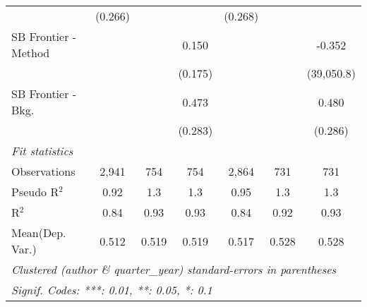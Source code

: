 \begin{tabular}{lcccccc}
                                & (0.266)     &             &             & (0.268)      &             &   \\   
   SB Frontier - Method         &             &             & 0.150       &              &             & -0.352\\   
                                &             &             & (0.175)     &              &             & (39,050.8)\\   
   SB Frontier - Bkg.           &             &             & 0.473       &              &             & 0.480\\   
                                &             &             & (0.283)     &              &             & (0.286)\\   
   \midrule
   \emph{Fit statistics}\\
   Observations                 & 2,941       & 754         & 754         & 2,864        & 731         & 731\\  
   Pseudo R$^2$                 & 0.92        & 1.3         & 1.3         & 0.95         & 1.3         & 1.3\\  
   R$^2$                        & 0.84        & 0.93        & 0.93        & 0.84         & 0.92        & 0.93\\  
Mean(Dep. Var.) & 0.512 & 0.519 & 0.519 & 0.517 & 0.528 & 0.528 \\
   \midrule \midrule
   \multicolumn{7}{l}{\emph{Clustered (author \& quarter\_year) standard-errors in parentheses}}\\
   \multicolumn{7}{l}{\emph{Signif. Codes: ***: 0.01, **: 0.05, *: 0.1}}\\
\end{tabular}
\par\endgroup
